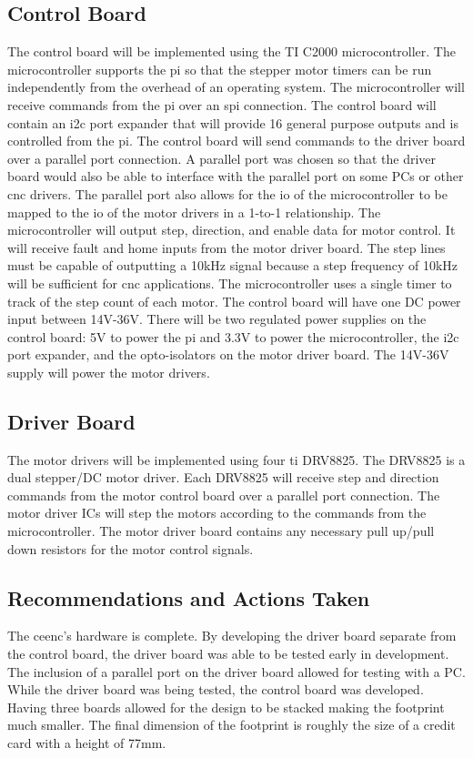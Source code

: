 \subsection{Control Board}
The control board will be implemented using the TI C2000 microcontroller.
The microcontroller supports the \gls{pi} so that the stepper motor timers can be run independently from the overhead of an operating system.
The microcontroller will receive commands from the \gls{pi} over an \gls{spi} connection.
The control board will contain an \gls{i2c} port expander that will provide 16 general purpose outputs and is controlled from the \gls{pi}.
The control board will send commands to the driver board over a parallel port connection.
A parallel port was chosen so that the driver board would also be able to interface with the parallel port on some PCs or other \gls{cnc} drivers.
The parallel port also allows for the \gls{io} of the microcontroller to be mapped to the \gls{io} of the motor drivers in a 1-to-1 relationship.
The microcontroller will output step, direction, and enable data for motor control.
It will receive fault and home inputs from the motor driver board.
The step lines must be capable of outputting a 10kHz signal because a step frequency of 10kHz will be sufficient for \gls{cnc} applications.
The microcontroller uses a single timer to track of the step count of each motor.
The control board will have one DC power input between 14V-36V.
There will be two regulated power supplies on the control board: 5V to power the \gls{pi} and 3.3V to power the microcontroller, the \gls{i2c} port expander, and the opto-isolators on the motor driver board.
The 14V-36V supply will power the motor drivers.

\subsection{Driver Board}
The motor drivers will be implemented using four \gls{ti} DRV8825.
The DRV8825 is a dual stepper/DC motor driver.
Each DRV8825 will receive step and direction commands from the motor control board over a parallel port connection.
The motor driver ICs will step the motors according to the commands from the microcontroller.
The motor driver board contains any necessary pull up/pull down resistors for the motor control signals.

\subsection{Recommendations and Actions Taken}
The \gls{ceenc}'s hardware is complete.
By developing the driver board separate from the control board, the driver board was able to be tested early in development.
The inclusion of a parallel port on the driver board allowed for testing with a PC.
While the driver board was being tested, the control board was developed.
Having three boards allowed for the design to be stacked making the footprint much smaller.
The final dimension of the footprint is roughly the size of a credit card with a height of 77mm.

